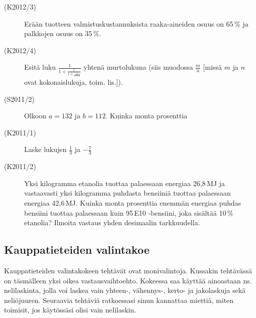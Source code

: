 \begin{description}
	\item[(K2012/3)] Erään tuotteen valmistuskustannuksista raaka-aineiden osuus on
        65\,\% ja palkkojen osuus on 35\,\%.
        

	\item[(K2012/4)] Esitä luku $\frac{1}{1+\frac{1}{1+\frac{1}{1+1}}}$ yhtenä murtolukuna (siis muodossa $\frac{m}{n}$ [missä $m$ ja $n$ ovat kokonaislukuja, toim. lis.]).
	\item[(S2011/2)] Olkoon $a=132$ ja  $b=112$. Kuinka monta prosenttia 
	\item[(K2011/1)] Laske lukujen $\frac{1}{3}$ ja $-\frac{7}{3}$
	\item[(K2011/2)] Yksi kilogramma etanolia tuottaa palaessaan energiaa 26,8\,MJ
        ja vastaavasti yksi kilogramma puhdasta bensiiniä tuottaa palaessaan energiaa
        42,6\,MJ. Kuinka monta prosenttia enemmän energiaa puhdas bensiini tuottaa
        palaessaan kuin 95\,E10 -bensiini, joka sisältää 10\,\% etanolia? Ilmoita
        vastaus yhden desimaalin tarkkuudella. 
\end{description}

\subsection*{Kauppatieteiden valintakoe}

Kauppatieteiden valintakokeen tehtävät ovat monivalintoja. Kussakin tehtävässä on täsmälleen yksi oikea vastausvaihtoehto. Kokeessa saa käyttää ainoastaan ns. nelilaskinta, jolla voi laskea vain yhteen-, vähennys-, kerto- ja jakolaskuja sekä neliöjuuren. Seuraavia tehtäviä ratkoessasi sinun kannattaa miettiä, miten toimisit, jos käytössäsi olisi vain nelilaskin.

